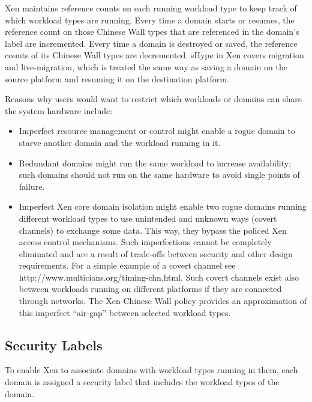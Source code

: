 \documentclass[11pt,twoside,final,openright]{report}
\begin{document}
Xen maintains reference counts on each running workload type to keep
track of which workload types are running. Every time a domain starts
or resumes, the reference count on those Chinese Wall types that are
referenced in the domain's label are incremented. Every time a domain
is destroyed or saved, the reference counts of its Chinese Wall types
are decremented. sHype in Xen covers migration and live-migration,
which is treated the same way as saving a domain on the source
platform and resuming it on the destination platform.

Reasons why users would want to restrict which workloads or domains
can share the system hardware include:

\begin{itemize}
\item Imperfect resource management or control might enable a rogue
  domain to starve another domain and the workload running in it.
\item Redundant domains might run the same workload to increase
  availability; such domains should not run on the same hardware to
  avoid single points of failure.
\item Imperfect Xen core domain isolation might enable two rogue
  domains running different workload types to use unintended and
  unknown ways (covert channels) to exchange some data. This way, they
  bypass the policed Xen access control mechanisms.  Such
  imperfections cannot be completely eliminated and are a result of
  trade-offs between security and other design requirements. For a
  simple example of a covert channel see
  http://www.multicians.org/timing-chn.html. Such covert channels
  exist also between workloads running on different platforms if they
  are connected through networks. The Xen Chinese Wall policy provides
  an approximation of this imperfect ``air-gap'' between selected
  workload types.
\end{itemize}

\subsection{Security Labels}

To enable Xen to associate domains with workload types running in
them, each domain is assigned a security label that includes the
workload types of the domain.
\end{document}
